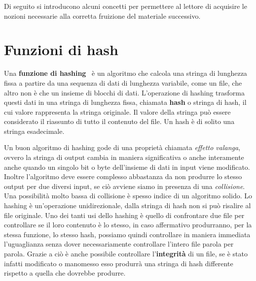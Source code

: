 Di seguito si introducono alcuni concetti 
per permettere al lettore di acquisire le nozioni necessarie alla
corretta fruizione del materiale successivo.

\section{Funzioni di hash}
\label{sub:hash}
Una \textbf{funzione di hashing}~\cite{hash} è un algoritmo che calcola una stringa di lunghezza
fissa a partire da una sequenza di dati di lunghezza variabile, come un file,
che altro non è che un insieme di blocchi di dati.
L’operazione di hashing trasforma questi dati in una stringa di lunghezza fissa, chiamata \textbf{hash} o stringa di hash,
il cui valore rappresenta la stringa originale. Il valore della stringa può essere considerato
il riassunto di tutto il contenuto del file. Un hash è di solito una stringa esadecimale.

Un buon algoritmo di hashing gode di una proprietà chiamata \emph{effetto valanga},
ovvero la stringa di output cambia in maniera significativa o anche interamente anche
quando un singolo bit o byte dell'insieme di dati in input viene modificato. Inoltre l’algoritmo deve essere
complesso abbastanza da non produrre lo stesso output per due diversi input, se ciò avviene
siamo in presenza di una \emph{collisione}. Una possibilità molto bassa di collisione è spesso
indice di un algoritmo solido. Lo hashing è un’operazione unidirezionale, dalla stringa di hash
non si può risalire al file originale.
Uno dei tanti usi dello hashing è quello di confrontare due file per controllare se il loro contenuto
è lo stesso, in caso affermativo produrranno, per la stessa funzione, lo stesso hash,
possiamo quindi controllare in maniera immediata l’uguaglianza senza dover necessariamente
controllare l’intero file parola per parola.
Grazie a ciò è anche possibile controllare l’\textbf{integrità} di un file, se è stato infatti
modificato o manomesso esso produrrà una stringa di hash differente rispetto a quella che dovrebbe produrre.

